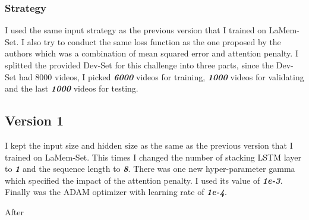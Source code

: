 \subsubsection{Strategy}
I used the same input strategy as the previous version that I trained on LaMem-Set. I also try to conduct the same loss function as the one proposed by the authors which was a combination of mean squared error and attention penalty. I splitted the provided Dev-Set for this challenge into three parts, since the Dev-Set had 8000 videos, I picked \textbf{\emph{6000}} videos for training, \textbf{\emph{1000}} videos for validating and the last \textbf{\emph{1000}} videos for testing.

\subsection{Version 1}
I kept the input size and hidden size as the same as the previous version that I trained on LaMem-Set. This times I changed the number of stacking LSTM layer to \textbf{\emph{1}} and the sequence length to \textbf{\emph{8}}. There was one new hyper-parameter gamma which specified the impact of the attention penalty. I used its value of \textbf{\emph{1e-3}}. Finally was the ADAM optimizer with learning rate of \textbf{\emph{1e-4}}.

After 













